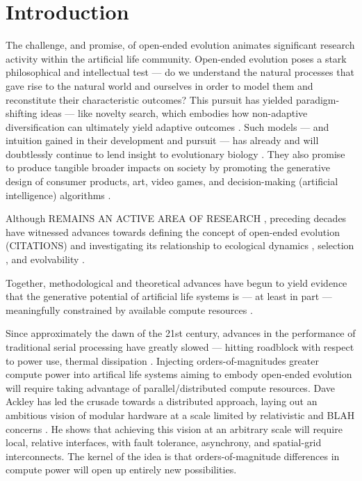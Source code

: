 \section{Introduction}

The challenge, and promise, of open-ended evolution animates significant research activity within the artificial life community.
Open-ended evolution poses a stark philosophical and intellectual test --- do we understand the natural processes that gave rise to the natural world and ourselves in order to model them and reconstitute their characteristic outcomes?
This pursuit has yielded paradigm-shifting ideas --- like novelty search, which embodies how non-adaptive diversification can ultimately yield adaptive outcomes \citep{lehman2011abandoning}.
Such models --- and intuition gained in their development and pursuit --- has already and will doubtlessly continue to lend insight to evolutionary biology \citep{lenski2003evolutionary}.
They also promise to produce tangible broader impacts on society by promoting the generative design of consumer products, art, video games, and decision-making (artificial intelligence) algorithms \citep{nguyen2015innovation, stanley2017open}.

Although REMAINS AN ACTIVE AREA OF RESEARCH \citep{packard2019overview},
preceding decades have witnessed advances towards defining the concept of open-ended evolution (CITATIONS) and investigating its relationship to ecological dynamics \citep{dolson2019modes}, selection \citep{soros2014identifying}, and evolvability \citep{huizinga2018emergence}.

Together, methodological and theoretical advances have begun to yield evidence that the generative potential of artificial life systems is --- at least in part --- meaningfully constrained by available compute resources \citep{channon2019maximum}.

Since approximately the dawn of the 21st century, advances in the performance of traditional serial processing have greatly slowed ---  hitting roadblock with respect to power use, thermal dissipation \citep{sutter2005free}.
Injecting orders-of-magnitudes greater compute power into artifical life systems aiming to embody open-ended evolution will require taking advantage of parallel/distributed compute resources.
Dave Ackley has led the crusade towards a distributed approach, laying out an ambitious vision of modular hardware at a scale limited by relativistic and BLAH concerns \citep{ackley2011pursue}.
He shows that achieving this vision at an arbitrary scale will require local, relative interfaces, with fault tolerance, asynchrony, and spatial-grid interconnects.
The kernel of the idea is that orders-of-magnitude differences in compute power will open up entirely new possibilities.

